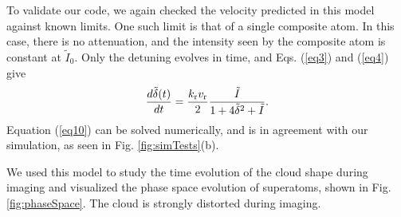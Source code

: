 \par To validate our code, we again checked the velocity predicted in this model against known limits. One such limit is that of a single composite atom. In this case, there is no attenuation, and the intensity seen by the composite atom is constant at $\tilde{I}_0$. Only the detuning  evolves in time, and Eqs. (\ref{eq3}) and (\ref{eq4}) give
\begin{equation}
\frac{d\tilde{\delta}(t)}{dt}= \frac{ k_{\rm{r}} v_{\rm{r}}}{2} \frac{\tilde{I}}{1+4\tilde{\delta}^2+\tilde{I}}.
\label{eq10}
\end{equation}
Equation (\ref{eq10}) can be solved numerically, and is in agreement with our simulation, as seen in Fig. \ref{fig:simTests}(b).
\par We used this model to study the time evolution of the cloud shape during imaging and visualized the phase space evolution of superatoms, shown in Fig. \ref{fig:phaseSpace}. The cloud is strongly distorted during imaging.
